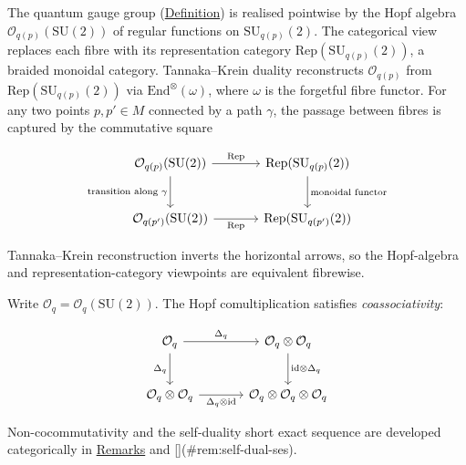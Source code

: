 \begin{remark}
  \label{rem:quantum-gauge-group-category}
The quantum gauge group
(\hyperref[def:quantum-gauge-group]{Definition}) is realised pointwise by
the Hopf algebra $\mathcal{O}_{q(p)}(\mathrm{SU}(2))$ of regular
functions on $\mathrm{SU}_{q(p)}(2)$. The categorical view replaces
each fibre with its representation category
$\mathrm{Rep}(\mathrm{SU}_{q(p)}(2))$, a braided monoidal category.
Tannaka--Krein duality reconstructs $\mathcal{O}_{q(p)}$ from
$\mathrm{Rep}(\mathrm{SU}_{q(p)}(2))$ via
$\mathrm{End}^{\otimes}(\omega)$, where $\omega$ is the forgetful
fibre functor. For any two points $p, p' \in M$ connected by a
path $\gamma$, the passage between fibres is captured by the
commutative square

\begin{equation}\label{eq:tannaka-krein-functoriality}
\begin{tikzcd}[row sep=2.5em, column sep=3.5em]
  \mathcal{O}_{q(p)}(\mathrm{SU}(2))
    \ar[r, "\mathrm{Rep}"]
    \ar[d, "\text{transition along } \gamma"']
  & \mathrm{Rep}(\mathrm{SU}_{q(p)}(2))
    \ar[d, "\text{monoidal functor}"]
  \\
  \mathcal{O}_{q(p')}(\mathrm{SU}(2))
    \ar[r, "\mathrm{Rep}"']
  & \mathrm{Rep}(\mathrm{SU}_{q(p')}(2))
\end{tikzcd}
\end{equation}

Tannaka--Krein reconstruction inverts the horizontal arrows, so the
Hopf-algebra and representation-category viewpoints are equivalent
fibrewise.
\end{remark}

\begin{remark}
  \label{rem:hopf-structure-diagrams}
Write $\mathcal{O}_q = \mathcal{O}_q(\mathrm{SU}(2))$.
The Hopf comultiplication satisfies \emph{coassociativity}:

\begin{equation}\label{eq:coassociativity}
\begin{tikzcd}[row sep=2.5em, column sep=3.5em]
  \mathcal{O}_q
    \ar[r, "\Delta_q"]
    \ar[d, "\Delta_q"']
  & \mathcal{O}_q \otimes \mathcal{O}_q
    \ar[d, "\mathrm{id} \otimes \Delta_q"]
  \\
  \mathcal{O}_q \otimes \mathcal{O}_q
    \ar[r, "\Delta_q \otimes \mathrm{id}"']
  & \mathcal{O}_q \otimes \mathcal{O}_q \otimes \mathcal{O}_q
\end{tikzcd}
\end{equation}

Non-cocommutativity and the self-duality short exact sequence are
developed categorically in
\hyperref[rem:hopf-non-cocommutativity]{Remarks}
and [](#rem:self-dual-ses).
\end{remark}

